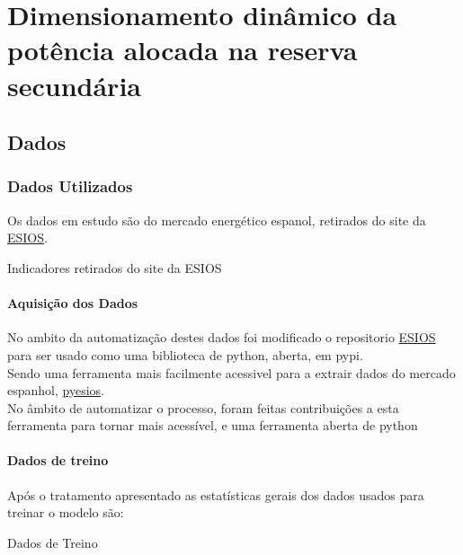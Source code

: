 \part{Dimensionamento dinâmico da potência alocada na reserva secundária}

\chapter{Dados}
\section{Dados Utilizados\label{se:dadosestudo}}

Os dados em estudo são do mercado energético espanol, retirados do site da \href{https://www.esios.ree.es/es}{\gls{ESIOS}}.


\begin{table}[H]
    \caption{Indicadores retirados do site da ESIOS}    
\end{table}


\subsection{Aquisição dos Dados}

No ambito da automatização destes dados foi modificado o repositorio \href{https://github.com/SanPen/\gls{ESIOS}}{\gls{ESIOS}} para ser usado como uma biblioteca de python, aberta, em pypi.\\
Sendo uma ferramenta mais facilmente acessivel para a extrair dados do mercado espanhol, \href{https://pypi.org/project/pyesios/}{pyesios}. \\
No âmbito de automatizar o processo, foram feitas contribuições a esta ferramenta para tornar mais acessível, e uma ferramenta aberta de python\\


\thispagestyle{plain}
 \label{se:dadoscrus}



\thispagestyle{plain}
 \label{se:tratamentodados}

\subsection{Dados de treino}

Após o tratamento apresentado as estatísticas gerais dos dados usados para treinar o modelo são:

\begin{table}[H]
    \caption{Dados de Treino}    
    \resizebox{\linewidth}{!}{}
    \end{table}
